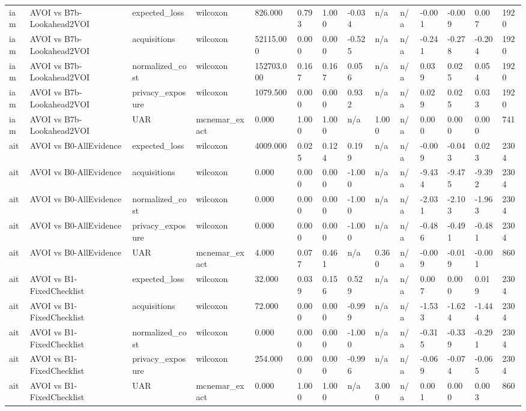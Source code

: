 \begin{table}[!ht]
{\begin{tabular}{llllllllllllll}
iam & AVOI vs B7b-Lookahead2VOI & expected\_loss & wilcoxon & 826.000 & 0.793 & 1.000 & -0.034 & n/a & n/a & -0.001 & -0.009 & 0.007 & 1920 \\
iam & AVOI vs B7b-Lookahead2VOI & acquisitions & wilcoxon & 52115.000 & 0.000 & 0.000 & -0.525 & n/a & n/a & -0.241 & -0.278 & -0.204 & 1920 \\
iam & AVOI vs B7b-Lookahead2VOI & normalized\_cost & wilcoxon & 152703.000 & 0.167 & 0.167 & 0.056 & n/a & n/a & 0.039 & 0.025 & 0.054 & 1920 \\
iam & AVOI vs B7b-Lookahead2VOI & privacy\_exposure & wilcoxon & 1079.500 & 0.000 & 0.000 & 0.932 & n/a & n/a & 0.029 & 0.025 & 0.033 & 1920 \\
iam & AVOI vs B7b-Lookahead2VOI & UAR & mcnemar\_exact & 0.000 & 1.000 & 1.000 & n/a & 1.000 & n/a & 0.000 & 0.000 & 0.000 & 741 \\
ait & AVOI vs B0-AllEvidence & expected\_loss & wilcoxon & 4009.000 & 0.025 & 0.124 & 0.199 & n/a & n/a & -0.009 & -0.043 & 0.023 & 2304 \\
ait & AVOI vs B0-AllEvidence & acquisitions & wilcoxon & 0.000 & 0.000 & 0.000 & -1.000 & n/a & n/a & -9.434 & -9.475 & -9.392 & 2304 \\
ait & AVOI vs B0-AllEvidence & normalized\_cost & wilcoxon & 0.000 & 0.000 & 0.000 & -1.000 & n/a & n/a & -2.031 & -2.103 & -1.963 & 2304 \\
ait & AVOI vs B0-AllEvidence & privacy\_exposure & wilcoxon & 0.000 & 0.000 & 0.000 & -1.000 & n/a & n/a & -0.486 & -0.491 & -0.481 & 2304 \\
ait & AVOI vs B0-AllEvidence & UAR & mcnemar\_exact & 4.000 & 0.077 & 0.461 & n/a & 0.360 & n/a & -0.009 & -0.019 & -0.001 & 860 \\
ait & AVOI vs B1-FixedChecklist & expected\_loss & wilcoxon & 32.000 & 0.039 & 0.156 & 0.529 & n/a & n/a & 0.007 & 0.000 & 0.019 & 2304 \\
ait & AVOI vs B1-FixedChecklist & acquisitions & wilcoxon & 72.000 & 0.000 & 0.000 & -0.999 & n/a & n/a & -1.533 & -1.624 & -1.444 & 2304 \\
ait & AVOI vs B1-FixedChecklist & normalized\_cost & wilcoxon & 0.000 & 0.000 & 0.000 & -1.000 & n/a & n/a & -0.315 & -0.339 & -0.291 & 2304 \\
ait & AVOI vs B1-FixedChecklist & privacy\_exposure & wilcoxon & 254.000 & 0.000 & 0.000 & -0.996 & n/a & n/a & -0.069 & -0.074 & -0.065 & 2304 \\
ait & AVOI vs B1-FixedChecklist & UAR & mcnemar\_exact & 0.000 & 1.000 & 1.000 & n/a & 3.000 & n/a & 0.001 & 0.000 & 0.003 & 860 \\

\end{tabular}}
\end{table}
